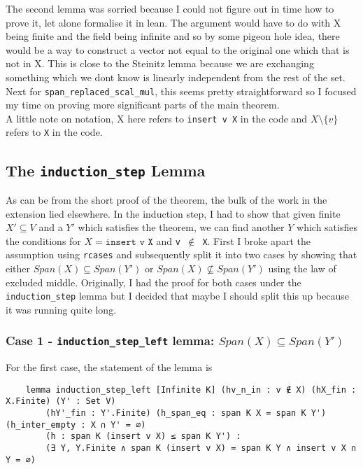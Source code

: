 \documentclass{article}
\begin{document}
The second lemma was sorried because I could not figure out in time how to prove it, let alone formalise it in lean. The argument would have to do with X being finite and the field being infinite and so by some pigeon hole idea, there would be a way to construct a vector not equal to the original one which that is not in X. This is close to the Steinitz lemma because we are exchanging something which we dont know is linearly independent from the rest of the set. Next for \texttt{span\_replaced\_scal\_mul}, this seems pretty straightforward so I focused my time on proving more significant parts of the main theorem.\\

A little note on notation, X here refers to \texttt{insert v X} in the code and \(X \setminus \{v\}\) refers to \texttt{X} in the code.

\subsection{The \texttt{induction\_step} Lemma}

As can be from the short proof of the theorem, the bulk of the work in the extension lied elsewhere. In the induction step, I had to show that given finite \(X' \subseteq V\) and a \(Y'\) which satisfies the theorem, we can find another \(Y\) which satisfies the conditions for  \(X = \texttt{insert v X}\) and \texttt{v $\notin$ X}. First I broke apart the assumption using \texttt{rcases} and subsequently split it into two cases by showing that either \(Span(X) \subseteq Span(Y') \text{ or } Span(X) \not\subseteq Span(Y') \) using the law of excluded middle. Originally, I had the proof for both cases under the \texttt{induction\_step} lemma but I decided that maybe I should split this up because it was running quite long.

\subsubsection{Case 1 - \texttt{induction\_step\_left} lemma: \(Span(X) \subseteq Span(Y')\)}

For the first case, the statement of the lemma is
\begin{lstlisting}
    lemma induction_step_left [Infinite K] (hv_n_in : v ∉ X) (hX_fin : X.Finite) (Y' : Set V)
        (hY'_fin : Y'.Finite) (h_span_eq : span K X = span K Y') (h_inter_empty : X ∩ Y' = ∅)
        (h : span K (insert v X) ≤ span K Y') :
        (∃ Y, Y.Finite ∧ span K (insert v X) = span K Y ∧ insert v X ∩ Y = ∅)
\end{lstlisting}
\end{document}
